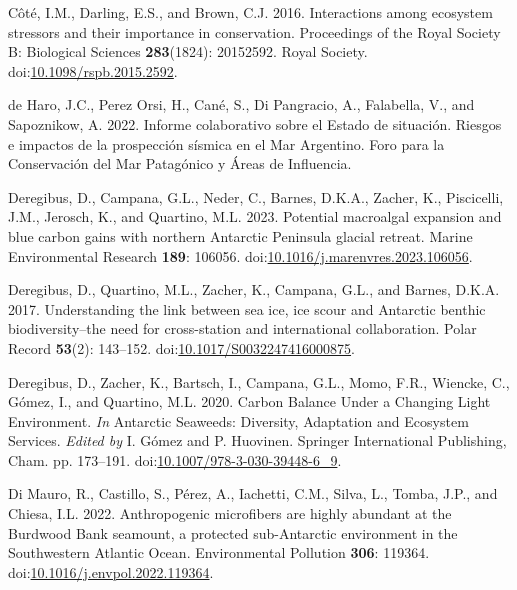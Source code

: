 \documentclass[
]{article}
\newlength{\cslhangindent}
\newenvironment{CSLReferences}[2] %
 {\begin{list}{}{%
  \setlength{\itemindent}{0pt}
  \setlength{\leftmargin}{0pt}
  \setlength{\parsep}{0pt}
  \ifodd #1
   \setlength{\leftmargin}{\cslhangindent}
   \setlength{\itemindent}{-1\cslhangindent}
  \fi
  \setlength{\itemsep}{#2\baselineskip}}}
 {\end{list}}
\begin{document}
\begin{CSLReferences}{1}{0}
Côté, I.M., Darling, E.S., and Brown, C.J. 2016. Interactions among
ecosystem stressors and their importance in conservation. Proceedings of
the Royal Society B: Biological Sciences \textbf{283}(1824): 20152592.
Royal Society.
doi:\href{https://doi.org/10.1098/rspb.2015.2592}{10.1098/rspb.2015.2592}.

de Haro, J.C., Perez Orsi, H., Cané, S., Di Pangracio, A., Falabella,
V., and Sapoznikow, A. 2022. {Informe colaborativo sobre el Estado de
situaci{ó}n. Riesgos e impactos de la prospecci{ó}n s{í}smica en el Mar
Argentino}. Foro para la Conservaci{ó}n del Mar Patag{ó}nico y {Á}reas
de Influencia.

Deregibus, D., Campana, G.L., Neder, C., Barnes, D.K.A., Zacher, K.,
Piscicelli, J.M., Jerosch, K., and Quartino, M.L. 2023. Potential
macroalgal expansion and blue carbon gains with northern {Antarctic
Peninsula} glacial retreat. Marine Environmental Research \textbf{189}:
106056.
doi:\href{https://doi.org/10.1016/j.marenvres.2023.106056}{10.1016/j.marenvres.2023.106056}.

Deregibus, D., Quartino, M.L., Zacher, K., Campana, G.L., and Barnes,
D.K.A. 2017. Understanding the link between sea ice, ice scour and
{Antarctic} benthic biodiversity--the need for cross-station and
international collaboration. Polar Record \textbf{53}(2): 143--152.
doi:\href{https://doi.org/10.1017/S0032247416000875}{10.1017/S0032247416000875}.

Deregibus, D., Zacher, K., Bartsch, I., Campana, G.L., Momo, F.R.,
Wiencke, C., Gómez, I., and Quartino, M.L. 2020. Carbon {Balance Under}
a {Changing Light Environment}. \emph{In} Antarctic {Seaweeds}:
{Diversity}, {Adaptation} and {Ecosystem Services}. \emph{Edited by} I.
Gómez and P. Huovinen. Springer International Publishing, Cham. pp.
173--191.
doi:\href{https://doi.org/10.1007/978-3-030-39448-6_9}{10.1007/978-3-030-39448-6\_9}.

Di Mauro, R., Castillo, S., Pérez, A., Iachetti, C.M., Silva, L., Tomba,
J.P., and Chiesa, I.L. 2022. Anthropogenic microfibers are highly
abundant at the {Burdwood Bank} seamount, a protected sub-{Antarctic}
environment in the {Southwestern Atlantic Ocean}. Environmental
Pollution \textbf{306}: 119364.
doi:\href{https://doi.org/10.1016/j.envpol.2022.119364}{10.1016/j.envpol.2022.119364}.


\end{CSLReferences}
\end{document}
